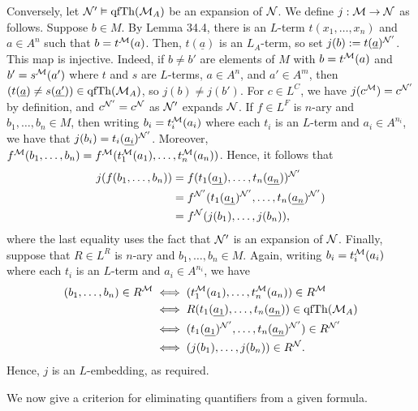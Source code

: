 \documentclass[10pt]{article}
\makeatletter
\DeclareMathOperator{\qfTh}{qfTh}
\theoremstyle{newstyle}
\newenvironment{pf}[1][\proofname]{\par
  \pushQED{\qed}%
  \normalfont \topsep0\p@\relax
  \trivlist
  \item[\hskip\labelsep\scshape
  #1\@addpunct{.}]\ignorespaces
}{%
  \popQED\endtrivlist\@endpefalse
}
\makeatother
\begin{document}
\begin{pf}
Conversely, let ${\cal N}' \vDash \qfTh({\cal M}_A)$ be an expansion of ${\cal N}$. 
We define $j : {\cal M} \to {\cal N}$ as follows. Suppose $b \in M$. By 
Lemma 34.4, there is an $L$-term $t(x_1, \dots, x_n)$ and $a \in A^n$ such that 
$b = t^{\cal M}(a)$. Then, $t(\underline{a})$ is an $L_A$-term, so set 
$j(b) := t(\underline{a})^{{\cal N}'}$. This map is injective. Indeed, if $b \neq b'$ 
are elements of $M$ with $b = t^{\cal M}(a)$ and $b' = s^{\cal M}(a')$ where 
$t$ and $s$ are $L$-terms, $a \in A^n$, and $a' \in A^m$, then $(t(\underline{a}) \neq 
s(\underline{a'})) \in \qfTh({\cal M}_A)$, so $j(b) \neq j(b')$. For 
$c \in L^C$, we have $j(c^{\cal M}) = c^{{\cal N}'}$ by definition, and 
$c^{{\cal N}'} = c^{\cal N}$ as ${\cal N}'$ expands ${\cal N}$. If 
$f \in L^F$ is $n$-ary and $b_1, \dots, b_n \in M$, then writing 
$b_i = t_i^{\cal M}(a_i)$ where each $t_i$ is an $L$-term and $a_i \in A^{n_i}$, 
we have that $j(b_i) = t_i(\underline{a_i})^{{\cal N}'}$. Moreover, 
$f^{\cal M}(b_1, \dots, b_n) = f^{\cal M}(t_1^{\cal M}(a_1), \dots, t_n^{\cal M}(a_n))$. 
Hence, it follows that 
\begin{align*}
    j(f(b_1, \dots, b_n)) &= f(t_1(\underline{a_1}), \dots, t_n(\underline{a_n}))^{{\cal N}'} \\
    &= f^{{\cal N}'}(t_1(\underline{a_1})^{{\cal N}'}, \dots, 
    t_n(\underline{a_n})^{{\cal N}'}) \\
    &= f^{\cal N}(j(b_1), \dots, j(b_n)),
\end{align*}
where the last equality uses the fact that ${\cal N}'$ is an expansion of ${\cal N}$. 
Finally, suppose that $R \in L^R$ is $n$-ary and $b_1, \dots, b_n \in M$. Again, 
writing $b_i = t_i^{\cal M}(a_i)$ where each $t_i$ is an $L$-term and $a_i \in A^{n_i}$, we have 
\begin{align*}
    (b_1, \dots, b_n) \in R^{\cal M} &\iff 
    (t_1^{\cal M}(a_1), \dots, t_n^{\cal M}(a_n)) \in R^{\cal M} \\
    &\iff R(t_1(\underline{a_1}), \dots, t_n(\underline{a_n})) \in \qfTh({\cal M}_A) \\
    &\iff (t_1(\underline{a_1})^{{\cal N}'}, \dots, t_n(\underline{a_n})^{{\cal N}'}) \in R^{{\cal N}'}\\
    &\iff (j(b_1), \dots, j(b_n)) \in R^{\cal N}.
\end{align*}
Hence, $j$ is an $L$-embedding, as required.
\end{pf}

We now give a criterion for eliminating quantifiers from a given formula. 
\end{document}
